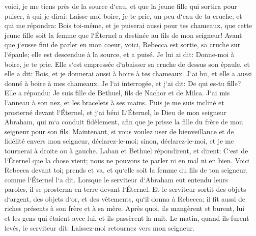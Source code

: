 \verse voici, je me tiens près de la source d`eau, et que la jeune fille qui sortira pour puiser, à qui je dirai: Laisse-moi boire, je te prie, un peu d`eau de ta cruche, et qui me répondra: 
\verse Bois toi-même, et je puiserai aussi pour tes chameaux, que cette jeune fille soit la femme que l`Éternel a destinée au fils de mon seigneur! 
\verse Avant que j`eusse fini de parler en mon coeur, voici, Rebecca est sortie, sa cruche sur l`épaule; elle est descendue à la source, et a puisé. Je lui ai dit: Donne-moi à boire, je te prie. 
\verse Elle s`est empressée d`abaisser sa cruche de dessus son épaule, et elle a dit: Bois, et je donnerai aussi à boire à tes chameaux. J`ai bu, et elle a aussi donné à boire à mes chameaux. 
\verse Je l`ai interrogée, et j`ai dit: De qui es-tu fille? Elle a répondu: Je suis fille de Bethuel, fils de Nachor et de Milca. J`ai mis l`anneau à son nez, et les bracelets à ses mains. 
\verse Puis je me suis incliné et prosterné devant l`Éternel, et j`ai béni L`Éternel, le Dieu de mon seigneur Abraham, qui m`a conduit fidèlement, afin que je prisse la fille du frère de mon seigneur pour son fils. 
\verse Maintenant, si vous voulez user de bienveillance et de fidélité envers mon seigneur, déclarez-le-moi; sinon, déclarez-le-moi, et je me tournerai à droite ou à gauche. 
\verse Laban et Bethuel répondirent, et dirent: C`est de l`Éternel que la chose vient; nous ne pouvons te parler ni en mal ni en bien. 
\verse Voici Rebecca devant toi; prends et va, et qu`elle soit la femme du fils de ton seigneur, comme l`Éternel l`a dit. 
\verse Lorsque le serviteur d`Abraham eut entendu leurs paroles, il se prosterna en terre devant l`Éternel. 
\verse Et le serviteur sortit des objets d`argent, des objets d`or, et des vêtements, qu`il donna à Rebecca; il fit aussi de riches présents à son frère et à sa mère. 
\verse Après quoi, ils mangèrent et burent, lui et les gens qui étaient avec lui, et ils passèrent la nuit. Le matin, quand ils furent levés, le serviteur dit: Laissez-moi retournez vers mon seigneur. 
